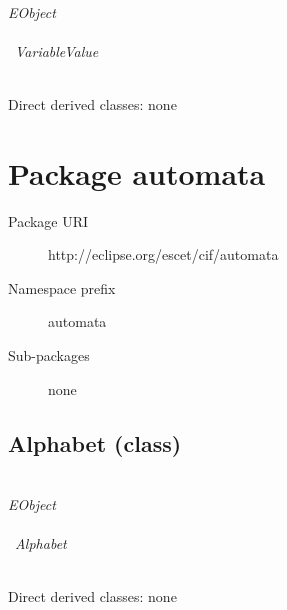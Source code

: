 ~\\ \noindent \emph{EObject} \\
\hook~ \\
\hookindent\hook~\emph{VariableValue}

~\\ \noindent Direct derived classes:
none

\begin{description}
{\featdocuPositionObjectposition}
{\featdocuVariableValuevalues}
\end{description}



\section{Package automata}\label{cifpkg:automata}
\pkgdocuautomata

\begin{description}
\item[Package URI] http://eclipse.org/escet/cif/automata
\item[Namespace prefix] automata
\item[Sub-packages] none
\end{description}

\subsection{Alphabet (class)}\label{cifclass:Alphabet}
\clsdocuAlphabet

~\\ \noindent \emph{EObject} \\
\hook~ \\
\hookindent\hook~\emph{Alphabet}

~\\ \noindent Direct derived classes:
none

\begin{description}
{\featdocuPositionObjectposition}
{\featdocuAlphabetevents}
\end{description}


